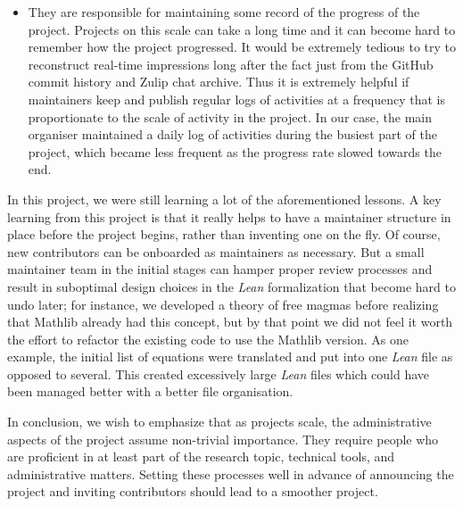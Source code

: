 \begin{itemize}
    \item They are responsible for maintaining some record of the progress of the project. Projects on this scale can take a long time and it can become hard to remember how the project progressed. It would be extremely tedious to try to reconstruct real-time impressions long after the fact just from the GitHub commit history and Zulip chat archive. Thus it is extremely helpful if maintainers keep and publish regular logs of activities at a frequency that is proportionate to the scale of activity in the project. In our case, the main organiser maintained a daily log of activities during the busiest part of the project, which became less frequent as the progress rate slowed towards the end.
\end{itemize}

In this project, we were still learning a lot of the aforementioned lessons. A key learning from this project is that it really helps to have a maintainer structure in place before the project begins, rather than inventing one on the fly. Of course, new contributors can be onboarded as maintainers as necessary. But a small maintainer team in the initial stages can hamper proper review processes and result in suboptimal design choices in the \emph{Lean} formalization that become hard to undo later; for instance, we developed a theory of free magmas before realizing that Mathlib already had this concept, but by that point we did not feel it worth the effort to refactor the existing code to use the Mathlib version. As one example, the initial list of equations were translated and put into one \emph{Lean} file as opposed to several. This created excessively large \emph{Lean} files which could have been managed better with a better file organisation.

In conclusion, we wish to emphasize that as projects scale, the administrative aspects of the project assume non-trivial importance. They require people who are proficient in at least part of the research topic, technical tools, and administrative matters. Setting these processes well in advance of announcing the project and inviting contributors should lead to a smoother project.
